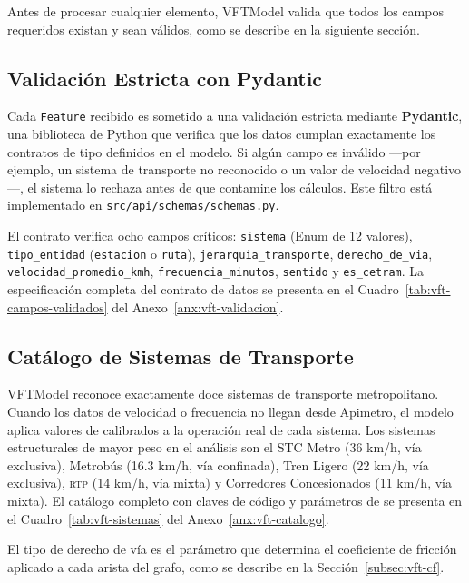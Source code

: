 Antes de procesar cualquier elemento, VFTModel valida que todos los campos
requeridos existan y sean válidos, como se describe en la siguiente sección.

\subsection{Validación Estricta con Pydantic}
\label{subsec:vft-pydantic}

Cada \texttt{Feature} recibido es sometido a una validación estricta mediante
\textbf{Pydantic}, una biblioteca de Python que verifica que los datos cumplan
exactamente los contratos de tipo definidos en el modelo. Si algún campo es
inválido —por ejemplo, un sistema de transporte no reconocido o un valor de
velocidad negativo—, el sistema lo rechaza antes de que contamine los cálculos.
Este filtro está implementado en \texttt{src/api/schemas/schemas.py}.

El contrato verifica ocho campos críticos: \texttt{sistema} (Enum de 12 valores), \texttt{tipo\_entidad} (\texttt{estacion} o \texttt{ruta}), \texttt{jerarquia\_transporte}, \texttt{derecho\_de\_via}, \texttt{velocidad\_promedio\_kmh}, \texttt{frecuencia\_minutos}, \texttt{sentido} y \texttt{es\_cetram}. La especificación completa del contrato de datos se presenta en el Cuadro~\ref{tab:vft-campos-validados} del Anexo~\ref{anx:vft-validacion}.

\subsection{Catálogo de Sistemas de Transporte}
\label{subsec:vft-sistemas}

VFTModel reconoce exactamente doce sistemas de transporte metropolitano. Cuando los datos de velocidad o frecuencia no llegan desde Apimetro, el modelo aplica valores de  calibrados a la operación real de cada sistema. Los sistemas estructurales de mayor peso en el análisis son el STC Metro (36 km/h, vía exclusiva), Metrobús (16.3 km/h, vía confinada), Tren Ligero (22 km/h, vía exclusiva), \textsc{rtp} (14 km/h, vía mixta) y Corredores Concesionados (11 km/h, vía mixta). El catálogo completo con claves de código y parámetros de  se presenta en el Cuadro~\ref{tab:vft-sistemas} del Anexo~\ref{anx:vft-catalogo}.

El tipo de derecho de vía es el parámetro que determina el coeficiente de
fricción aplicado a cada arista del grafo, como se describe en la
Sección~\ref{subsec:vft-cf}.


